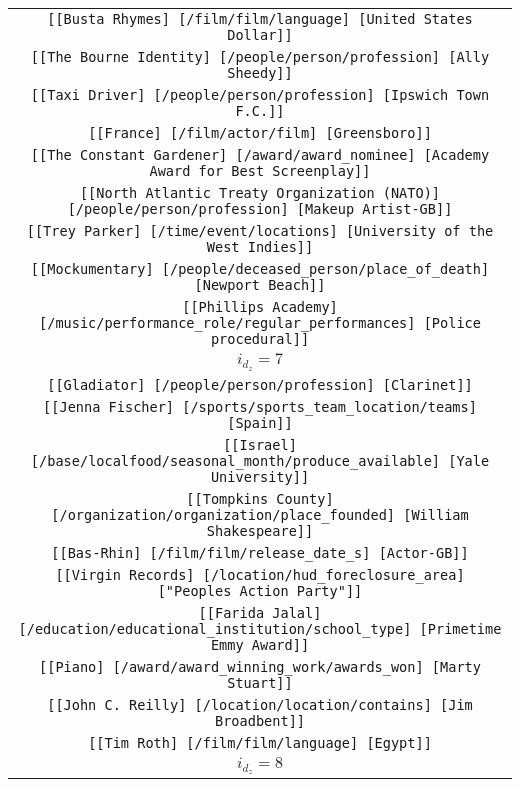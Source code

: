 \begin{longtable}{|c|}
    \texttt{[[Busta Rhymes] [/film/film/language] [United States Dollar]]}\\
    \texttt{[[The Bourne Identity] [/people/person/profession] [Ally Sheedy]]}\\
    \texttt{[[Taxi Driver] [/people/person/profession] [Ipswich Town F.C.]]}\\
    \texttt{[[France] [/film/actor/film] [Greensboro]]}\\
    \texttt{[[The Constant Gardener] [/award/award\_nominee] [Academy Award for Best Screenplay]]}\\
    \texttt{[[North Atlantic Treaty Organization (NATO)] [/people/person/profession] [Makeup Artist-GB]]}\\
    \texttt{[[Trey Parker] [/time/event/locations] [University of the West Indies]]}\\
    \texttt{[[Mockumentary] [/people/deceased\_person/place\_of\_death] [Newport Beach]]}\\
    \texttt{[[Phillips Academy] [/music/performance\_role/regular\_performances] [Police procedural]]}\\
    \hline
    \rowcolor[HTML]{EFEFEF} 
    \textsc{$i_{d_z}=7$}\\ \hline
    \texttt{[[Gladiator] [/people/person/profession] [Clarinet]]}\\
    \texttt{[[Jenna Fischer] [/sports/sports\_team\_location/teams] [Spain]]}\\
    \texttt{[[Israel] [/base/localfood/seasonal\_month/produce\_available] [Yale University]]}\\
    \texttt{[[Tompkins County] [/organization/organization/place\_founded] [William Shakespeare]]}\\
    \texttt{[[Bas-Rhin] [/film/film/release\_date\_s] [Actor-GB]]}\\
    \texttt{[[Virgin Records] [/location/hud\_foreclosure\_area] ["Peoples Action Party"]]}\\
    \texttt{[[Farida Jalal] [/education/educational\_institution/school\_type] [Primetime Emmy Award]]}\\
    \texttt{[[Piano] [/award/award\_winning\_work/awards\_won] [Marty Stuart]]}\\
    \texttt{[[John C. Reilly] [/location/location/contains] [Jim Broadbent]]}\\
    \texttt{[[Tim Roth] [/film/film/language] [Egypt]]}\\
    \hline
    \rowcolor[HTML]{EFEFEF} 
    \textsc{$i_{d_z}=8$}\\ \hline

\end{longtable}
